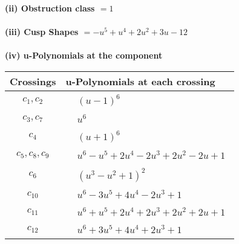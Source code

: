 \documentclass[1p]{elsarticle_modified}
\theoremstyle{definition}
\begin{document}
\flushleft \textbf{(ii) Obstruction class $= 1$}\\~\\
\flushleft \textbf{(iii) Cusp Shapes $= - u^5+u^4+2 u^2+3 u-12$}\\~\\
\newpage\renewcommand{\arraystretch}{1}
\flushleft \textbf{(iv) u-Polynomials at the component}\newline \\
\begin{tabular}{m{50pt}|m{274pt}}
Crossings & \hspace{64pt}u-Polynomials at each crossing \\
\hline $$\begin{aligned}c_{1},c_{2}\end{aligned}$$&$\begin{aligned}
&(u-1)^6
\end{aligned}$\\
\hline $$\begin{aligned}c_{3},c_{7}\end{aligned}$$&$\begin{aligned}
&u^6
\end{aligned}$\\
\hline $$\begin{aligned}c_{4}\end{aligned}$$&$\begin{aligned}
&(u+1)^6
\end{aligned}$\\
\hline $$\begin{aligned}c_{5},c_{8},c_{9}\end{aligned}$$&$\begin{aligned}
&u^6- u^5+2 u^4-2 u^3+2 u^2-2 u+1
\end{aligned}$\\
\hline $$\begin{aligned}c_{6}\end{aligned}$$&$\begin{aligned}
&(u^3- u^2+1)^2
\end{aligned}$\\
\hline $$\begin{aligned}c_{10}\end{aligned}$$&$\begin{aligned}
&u^6-3 u^5+4 u^4-2 u^3+1
\end{aligned}$\\
\hline $$\begin{aligned}c_{11}\end{aligned}$$&$\begin{aligned}
&u^6+u^5+2 u^4+2 u^3+2 u^2+2 u+1
\end{aligned}$\\
\hline $$\begin{aligned}c_{12}\end{aligned}$$&$\begin{aligned}
&u^6+3 u^5+4 u^4+2 u^3+1
\end{aligned}$\\
\hline
\end{tabular}\\~\\
\end{document}
